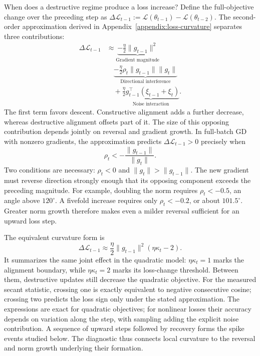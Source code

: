 When does a destructive regime produce a loss increase? Define the
full-objective change over the preceding step as
$\Delta\mathcal L_{t-1}:=\mathcal L(\theta_{t-1})-
\mathcal L(\theta_{t-2})$.
The second-order approximation derived in Appendix~\ref{appendix:loss-curvature}
separates three contributions:
\begin{equation}
\begin{aligned}
\Delta\mathcal L_{t-1}
&\approx\underbrace{-\frac{\eta}{2}\|g_{t-1}\|^2}_{\text{Gradient magnitude}}\\
&\quad\underbrace{-\frac{\eta}{2}\rho_t\|g_{t-1}\|\|g_t\|}_{\text{Directional interference}}\\
&\quad+\underbrace{\frac{\eta}{2}g_{t-1}^\top(\xi_{t-1}+\xi_t)}_{\text{Noise interaction}}.
\end{aligned}
\label{eq:loss-curvature}
\end{equation}
The first term favors descent. Constructive alignment adds a further
decrease, whereas destructive alignment offsets part of it. The size
of this opposing contribution depends jointly on reversal and gradient
growth. In full-batch GD with nonzero gradients, the approximation
predicts $\Delta\mathcal L_{t-1}>0$ precisely when
\begin{equation}
  \boxed{\rho_t<-\frac{\|g_{t-1}\|}{\|g_t\|}.}
  \label{eq:loss-rise-alignment}
\end{equation}
Two conditions are necessary: $\rho_t<0$ and
$\|g_t\|>\|g_{t-1}\|$. The new gradient must reverse direction strongly
enough that its opposing component exceeds the preceding magnitude.
For example, doubling the norm requires $\rho_t<-0.5$, an angle above
$120^\circ$. A fivefold increase requires only $\rho_t<-0.2$, or about
$101.5^\circ$. Greater norm growth therefore makes even a milder
reversal sufficient for an upward loss step.

The equivalent curvature form is
\begin{equation}
  \Delta\mathcal L_{t-1}\approx
  \frac{\eta}{2}\|g_{t-1}\|^2(\eta\kappa_t-2).
  \label{eq:loss-rise-curvature}
\end{equation}
It summarizes the same joint effect in the quadratic model:
$\eta\kappa_t=1$ marks the alignment boundary, while
$\eta\kappa_t=2$ marks its loss-change threshold. Between them,
destructive updates still decrease the quadratic objective.
For the measured secant statistic, crossing one is exactly equivalent
to negative consecutive cosine; crossing two predicts the loss sign
only under the stated approximation. The expressions are exact for quadratic
objectives; for nonlinear losses their accuracy depends on variation
along the step, with sampling adding the explicit noise contribution.
A sequence of upward steps followed by recovery forms the spike
events studied below. The diagnostic thus connects local curvature
to the reversal and norm growth underlying their formation.
